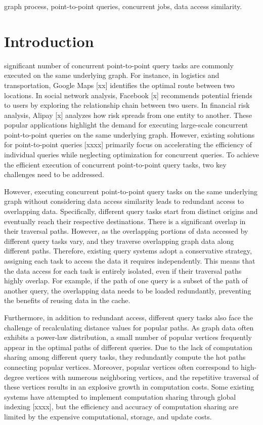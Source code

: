 \documentclass[lettersize,journal]{IEEEtran} %
\begin{document}
\begin{IEEEkeywords}
graph process, point-to-point queries, concurrent jobs, data access similarity.
\end{IEEEkeywords}


\section{Introduction}
 significant number of concurrent point-to-point query tasks are commonly executed on the same underlying graph. For instance, in logistics and transportation, Google Maps [xx] identifies the optimal route between two locations. In social network analysis, Facebook [x] recommends potential friends to users by exploring the relationship chain between two users. In financial risk analysis, Alipay [x] analyzes how risk spreads from one entity to another. These popular applications highlight the demand for executing large-scale concurrent point-to-point queries on the same underlying graph. However, existing solutions for point-to-point queries [xxxx] primarily focus on accelerating the efficiency of individual queries while neglecting optimization for concurrent queries. To achieve the efficient execution of concurrent point-to-point query tasks, two key challenges need to be addressed.


However, executing concurrent point-to-point query tasks on the same underlying graph without considering data access similarity leads to redundant access to overlapping data. Specifically, different query tasks start from distinct origins and eventually reach their respective destinations. There is a significant overlap in their traversal paths. However, as the overlapping portions of data accessed by different query tasks vary, and they traverse overlapping graph data along different paths. Therefore, existing query systems adopt a conservative strategy, assigning each task to access the data it requires independently. This means that the data access for each task is entirely isolated, even if their traversal paths highly overlap. For example, if the path of one query is a subset of the path of another query, the overlapping data needs to be loaded redundantly, preventing the benefits of reusing data in the cache.

Furthermore, in addition to redundant access, different query tasks also face the challenge of recalculating distance values for popular paths. As graph data often exhibits a power-law distribution, a small number of popular vertices frequently appear in the optimal paths of different queries. Due to the lack of computation sharing among different query tasks, they redundantly compute the hot paths connecting popular vertices. Moreover, popular vertices often correspond to high-degree vertices with numerous neighboring vertices, and the repetitive traversal of these vertices results in an explosive growth in computation costs. Some existing systems have attempted to implement computation sharing through global indexing [xxxx], but the efficiency and accuracy of computation sharing are limited by the expensive computational, storage, and update costs.
\end{document}
